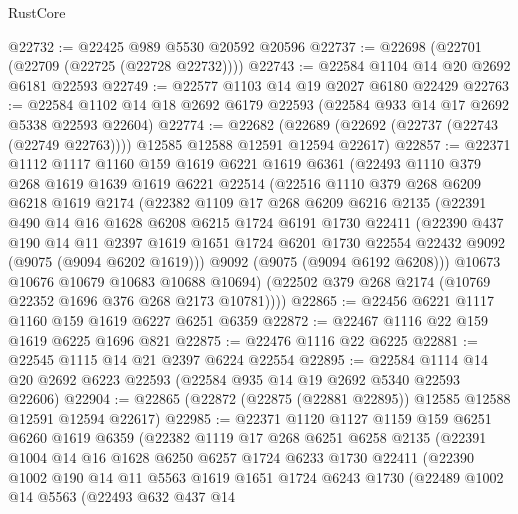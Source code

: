 \begin{lexlean}{RustCore}
\begin{coremodule}
@22732 := @22425 @989 @5530 @20592 @20596
@22737 := @22698 (@22701 (@22709 (@22725 (@22728 @22732))))
@22743 := @22584 @1104 @14 @20 @2692 @6181 @22593
@22749 := @22577 @1103 @14 @19 @2027 @6180 @22429
@22763 := @22584 @1102 @14 @18 @2692 @6179 @22593 (@22584 @933 @14 @17 @2692 @5338 @22593 @22604)
@22774 := @22682
    (@22689 (@22692 (@22737 (@22743 (@22749 @22763)))) @12585 @12588 @12591 @12594 @22617)
@22857 := @22371
    @1112
    @1117
    @1160
    @159
    @1619
    @6221
    @1619
    @6361
    (@22493
      @1110
      @379
      @268
      @1619
      @1639
      @1619
      @6221
      @22514
      (@22516
        @1110
        @379
        @268
        @6209
        @6218
        @1619
        @2174
        (@22382
          @1109
          @17
          @268
          @6209
          @6216
          @2135
          (@22391
            @490
            @14
            @16
            @1628
            @6208
            @6215
            @1724
            @6191
            @1730
            @22411
            (@22390
              @437
              @190
              @14
              @11
              @2397
              @1619
              @1651
              @1724
              @6201
              @1730
              @22554
              @22432
              @9092
              (@9075 (@9094 @6202 @1619)))
            @9092
            (@9075 (@9094 @6192 @6208)))
          @10673
          @10676
          @10679
          @10683
          @10688
          @10694)
        (@22502 @379 @268 @2174 (@10769 @22352 @1696 @376 @268 @2173 @10781))))
@22865 := @22456 @6221 @1117 @1160 @159 @1619 @6227 @6251 @6359
@22872 := @22467 @1116 @22 @159 @1619 @6225 @1696 @821
@22875 := @22476 @1116 @22 @6225
@22881 := @22545 @1115 @14 @21 @2397 @6224 @22554
@22895 := @22584 @1114 @14 @20 @2692 @6223 @22593 (@22584 @935 @14 @19 @2692 @5340 @22593 @22606)
@22904 := @22865 (@22872 (@22875 (@22881 @22895)) @12585 @12588 @12591 @12594 @22617)
@22985 := @22371
    @1120
    @1127
    @1159
    @159
    @6251
    @6260
    @1619
    @6359
    (@22382
      @1119
      @17
      @268
      @6251
      @6258
      @2135
      (@22391
        @1004
        @14
        @16
        @1628
        @6250
        @6257
        @1724
        @6233
        @1730
        @22411
        (@22390
          @1002
          @190
          @14
          @11
          @5563
          @1619
          @1651
          @1724
          @6243
          @1730
          (@22489
            @1002
            @14
            @5563
            (@22493
              @632
              @437
              @14

\end{coremodule}
\end{lexlean}
